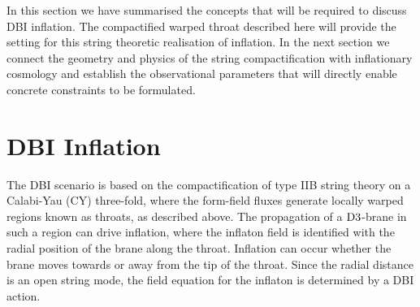 In this section we have summarised the concepts that will be
required to discuss DBI inflation. The compactified warped throat described
here will provide the setting for this string theoretic realisation of
inflation. 
In the next
section we connect the geometry and physics of the string compactification with
inflationary cosmology and establish the observational parameters that will directly
enable concrete constraints to be formulated. 

% 
% 
\section{DBI Inflation} 
% 
\label{sec:dbiinflation}
The DBI scenario is based on the compactification of type IIB string theory on a 
Calabi-Yau (CY) three-fold, where the form-field fluxes generate locally
warped regions known as throats, as described above.  The propagation of a 
${\rm D3}$-brane in such a region can drive inflation, where the inflaton 
field is identified with the radial position of the brane 
along the throat. Inflation can occur whether the brane moves towards or away from the tip of the
throat.
Since the radial distance is an open string mode, the field 
equation for the inflaton is determined by a DBI action.

